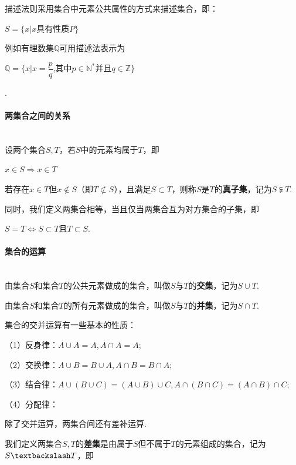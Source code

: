 \documentclass{ctexbook}
\begin{document}
	描述法则采用集合中元素公共属性的方式来描述集合，即：
	
	\centerline{$S=\{x|x$具有性质$P\}$}
	
	例如有理数集$\mathbb{Q}$可用描述法表示为
	
	\centerline{$\mathbb{Q}=\{x|x=\dfrac{p}{q}$,其中$p\in\mathbb{N^*}$并且$q\in\mathbb{Z}\}$}.
	
	\paragraph{两集合之间的关系}~{}
	\\
	\indent
	设两个集合$S,T$，若$S$中的元素均属于$T$，即
	
	\centerline{$x\in S \Rightarrow x\in T$}
	
	若存在$x\in T$但$x\notin S$（即$T \not\subset S$），且满足$S\subset T$，则称$S$是$T$的\textbf{真子集}，记为$S \subsetneqq T$.
	
	同时，我们定义两集合相等，当且仅当两集合互为对方集合的子集，即
	
	\centerline{$S=T \Leftrightarrow S\subset T$且$T \subset S$.}
	
	\paragraph{集合的运算}~{}
	\\
	\indent
	由集合$S$和集合$T$的公共元素做成的集合，叫做$S$与$T$的\textbf{交集}，记为$S\cup T$.
	
	由集合$S$和集合$T$的所有元素做成的集合，叫做$S$与$T$的\textbf{并集}，记为$S\cap T$.
	
	集合的交并运算有一些基本的性质：
	
	（1）反身律：$A\cup A=A$,$\,A\cap A=A$;
	
	（2）交换律：$A\cup B=B\cup A$,$\,A\cap B=B\cap A$;
	
	（3）结合律：$A\cup (B \cup C)=(A\cup B)\cup C$,$\,A\cap (B \cap C)=(A\cap B)\cap C$;
	
	（4）分配律：

	除了交并运算，两集合间还有差补运算.
	
	我们定义两集合$S,T$的\textbf{差集}是由属于$S$但不属于$T$的元素组成的集合，记为$S\textbackslash T$，即
	
\end{document}
